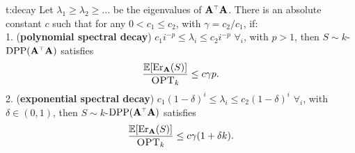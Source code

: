 \documentclass{article}
\begin{document}
\begin{reptheorem}{t:decay}
Let $\lambda_1\!\geq\!\lambda_2\!\geq\!...$ be the
eigenvalues of $\A^\top\A$. There is an absolute constant $c$ such that
for any $0\!<\!c_1\!\leq\!c_2$, with $\gamma=c_2/c_1$, if:\\[2mm]
\textnormal{1.} (\textbf{polynomial spectral decay}) $c_1i^{-p}\!\leq\!
  \lambda_i\!\leq\! c_2i^{-p}$ $\forall_i$, with $p>1$, then $S\sim
k$-$\DPP(\A^\top\A)$ satisfies
  \begin{align*}
    \frac{\mathbb E[\mathrm{Er}_\mathbf A(S)]}{{\textsc{OPT}_k}}\leq c \gamma p. 
  \end{align*}
\textnormal{2.} (\textbf{exponential spectral decay}) $c_1(1\!-\!\delta)^{i}\leq \lambda_i\leq
  c_2(1\!-\!\delta)^{i}$ $\forall_i$, with $\delta\in(0,1)$, then $S\sim
k$-$\DPP(\A^\top\A)$ satisfies
  \begin{align*}
    \frac{\mathbb E[\mathrm{Er}_\mathbf A(S)]}{{\textsc{OPT}_k}}\leq c\gamma(1+ \delta k).
  \end{align*}
 \end{reptheorem}
\end{document}
